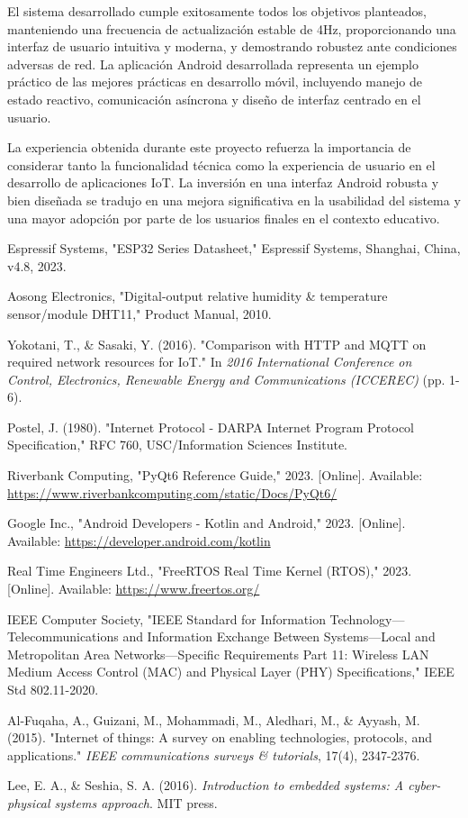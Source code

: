 \documentclass[conference,a4paper]{IEEEtran}
\begin{document}
El sistema desarrollado cumple exitosamente todos los objetivos planteados, manteniendo una frecuencia de actualización estable de 4Hz, proporcionando una interfaz de usuario intuitiva y moderna, y demostrando robustez ante condiciones adversas de red. La aplicaci\'on Android desarrollada representa un ejemplo pr\'actico de las mejores pr\'acticas en desarrollo m\'ovil, incluyendo manejo de estado reactivo, comunicaci\'on as\'incrona y dise\~{n}o de interfaz centrado en el usuario.

La experiencia obtenida durante este proyecto refuerza la importancia de considerar tanto la funcionalidad t\'ecnica como la experiencia de usuario en el desarrollo de aplicaciones IoT. La inversi\'on en una interfaz Android robusta y bien dise\~{n}ada se tradujo en una mejora significativa en la usabilidad del sistema y una mayor adopci\'on por parte de los usuarios finales en el contexto educativo.


\begin{thebibliography}{99}
Espressif Systems, "ESP32 Series Datasheet," Espressif Systems, Shanghai, China, v4.8, 2023.

Aosong Electronics, "Digital-output relative humidity \& temperature sensor/module DHT11," Product Manual, 2010.

Yokotani, T., \& Sasaki, Y. (2016). "Comparison with HTTP and MQTT on required network resources for IoT." In \textit{2016 International Conference on Control, Electronics, Renewable Energy and Communications (ICCEREC)} (pp. 1-6).

Postel, J. (1980). "Internet Protocol - DARPA Internet Program Protocol Specification," RFC 760, USC/Information Sciences Institute.

Riverbank Computing, "PyQt6 Reference Guide," 2023. [Online]. Available: \url{https://www.riverbankcomputing.com/static/Docs/PyQt6/}

Google Inc., "Android Developers - Kotlin and Android," 2023. [Online]. Available: \url{https://developer.android.com/kotlin}

Real Time Engineers Ltd., "FreeRTOS Real Time Kernel (RTOS)," 2023. [Online]. Available: \url{https://www.freertos.org/}

IEEE Computer Society, "IEEE Standard for Information Technology—Telecommunications and Information Exchange Between Systems—Local and Metropolitan Area Networks—Specific Requirements Part 11: Wireless LAN Medium Access Control (MAC) and Physical Layer (PHY) Specifications," IEEE Std 802.11-2020.

Al-Fuqaha, A., Guizani, M., Mohammadi, M., Aledhari, M., \& Ayyash, M. (2015). "Internet of things: A survey on enabling technologies, protocols, and applications." \textit{IEEE communications surveys \& tutorials}, 17(4), 2347-2376.

Lee, E. A., \& Seshia, S. A. (2016). \textit{Introduction to embedded systems: A cyber-physical systems approach}. MIT press.

\end{thebibliography}
\end{document}
